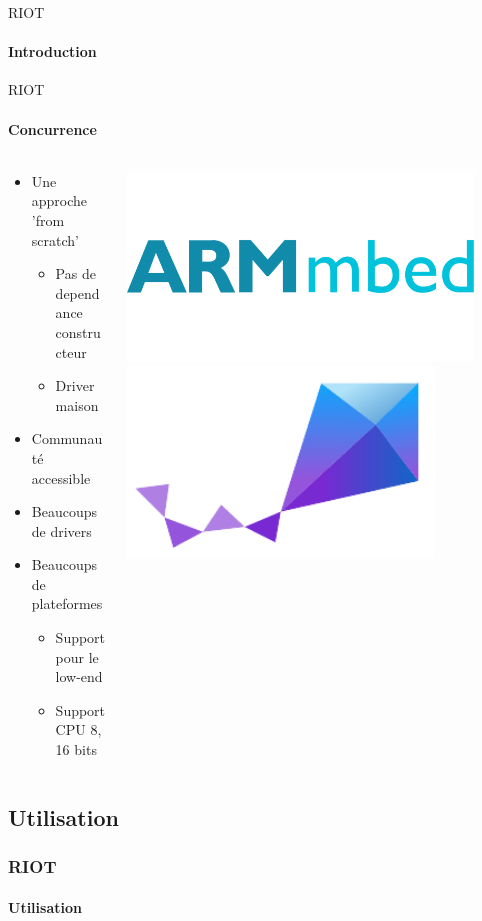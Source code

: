 \begin{frame}{RIOT}
\framesubtitle{Introduction}

\end{frame}

\begin{frame}{RIOT}
\framesubtitle{Concurrence}
\begin{columns}
\begin{column}{0.6\textwidth}
 \begin{itemize}
  \item Une approche 'from scratch'
  \begin{itemize}
    \item Pas de dependance constructeur
    \item Driver maison
  \end{itemize}
  \item Communauté accessible
  \item Beaucoups de drivers
  \item Beaucoups de plateformes
  \begin{itemize}
    \item Support pour le low-end
    \item Support CPU 8, 16 bits
  \end{itemize}
\end{itemize}
\end{column}
\begin{column}{0.4\textwidth}
\begin{center}
  \includegraphics[width=0.9\textwidth]{presentation.tex/fig/armmbed.png}
  \includegraphics[width=0.8\textwidth]{presentation.tex/fig/zephyr.png}
\end{center}
\end{column}
\end{columns}
\end{frame}

\subsection{Utilisation}

\begin{frame}[t]
  \frametitle{RIOT}
  \framesubtitle{Utilisation}
\end{frame}

